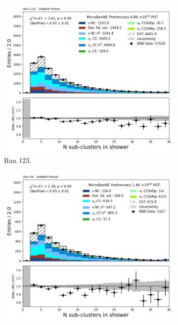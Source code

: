 \begin{figure}[H]
    \centering
    \begin{subfigure}[t]{0.32\linewidth}
        \includegraphics[width=\linewidth]{technote/Appendix_Preselection/Figures/1eNp0pi/Run123/subcluster_Run123_1eNp0pi_Presel.png}
        \caption{Run 123.}
    \end{subfigure}%
    \hspace{0.2cm}%
    \begin{subfigure}[t]{0.32\linewidth}
        \includegraphics[width=\linewidth]{technote/Appendix_Preselection/Figures/1eNp0pi/Run4b/subcluster_Run4b_1eNp0pi_Presel.png}

\end{subfigure}
\end{figure}
